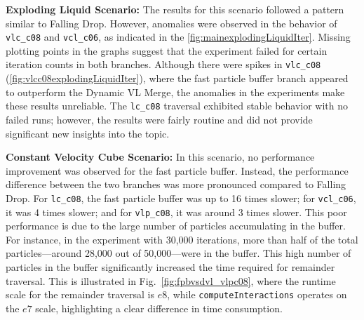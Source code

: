 

\textbf{Exploding Liquid Scenario:}
The results for this scenario followed a pattern similar to Falling Drop. However, anomalies were observed in the behavior of \texttt{vlc\_c08} and \texttt{vcl\_c06}, as indicated in the \ref{fig:mainexplodingLiquidIter}. Missing plotting points in the graphs suggest that the experiment failed for certain iteration counts in both branches. Although there were spikes in \texttt{vlc\_c08} (\ref{fig:vlcc08explodingLiquidIter}), where the fast particle buffer branch appeared to outperform the Dynamic VL Merge, the anomalies in the experiments make these results unreliable. The \texttt{lc\_c08} traversal exhibited stable behavior with no failed runs; however, the results were fairly routine and did not provide significant new insights into the topic.


\textbf{Constant Velocity Cube Scenario:}
In this scenario, no performance improvement was observed for the fast particle buffer. Instead, the performance difference between the two branches was more pronounced compared to Falling Drop. For \texttt{lc\_c08}, the fast particle buffer was up to 16 times slower; for \texttt{vcl\_c06}, it was 4 times slower; and for \texttt{vlp\_c08}, it was around 3 times slower.
This poor performance is due to the large number of particles accumulating in the buffer. For instance, in the experiment with 30,000 iterations, more than half of the total particles—around 28,000 out of 50,000—were in the buffer. This high number of particles in the buffer significantly increased the time required for remainder traversal. This is illustrated in Fig.~\ref{fig:fpbvsdvl_vlpc08}, where the runtime scale for the remainder traversal is $e8$, while \texttt{computeInteractions} operates on the $e7$ scale, highlighting a clear difference in time consumption.



